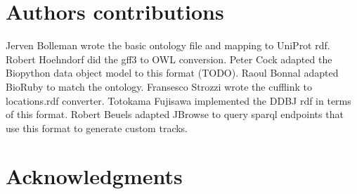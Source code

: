 \documentclass[10pt]{bmc_article}
\newenvironment{bmcformat}{\begin{raggedright}\baselineskip20pt\sloppy\setboolean{publ}{false}}{\end{raggedright}\baselineskip20pt\sloppy}
\begin{document}
\begin{bmcformat}
\section{Authors contributions}

Jerven Bolleman wrote the basic ontology file and mapping to UniProt rdf.
Robert Hoehndorf did the gff3 to OWL conversion.
Peter Cock adapted the Biopython data object model to this format (TODO).
Raoul Bonnal adapted BioRuby to match the ontology.
Fransesco Strozzi wrote the cufflink to locations.rdf converter.
Totokama Fujisawa implemented the DDBJ rdf in terms of this format.
Robert Beuels adapted JBrowse to query sparql endpoints that use this format to generate custom tracks. 

\section{Acknowledgments}



\newpage
{
   }     %
  
\end{bmcformat}
\end{document}

